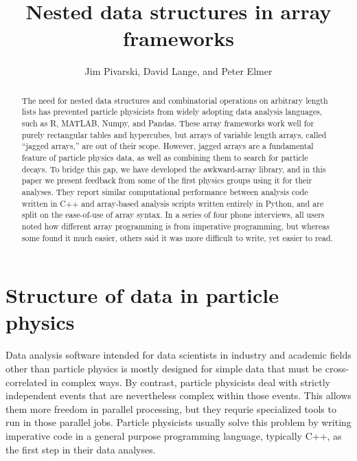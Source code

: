 \documentclass[a4paper]{jpconf}
\begin{document}
\title{Nested data structures in array frameworks}

\author{Jim Pivarski, David Lange, and Peter Elmer}

\address{Princeton University}


\begin{abstract}
The need for nested data structures and combinatorial operations on arbitrary length lists has prevented particle physicists from widely adopting data analysis languages, such as R, MATLAB, Numpy, and Pandas. These array frameworks work well for purely rectangular tables and hypercubes, but arrays of variable length arrays, called ``jagged arrays,'' are out of their scope. However, jagged arrays are a fundamental feature of particle physics data, as well as combining them to search for particle decays. To bridge this gap, we have developed the awkward-array library, and in this paper we present feedback from some of the first physics groups using it for their analyses. They report similar computational performance between analysis code written in C++ and array-based analysis scripts written entirely in Python, and are split on the ease-of-use of array syntax. In a series of four phone interviews, all users noted how different array programming is from imperative programming, but whereas some found it much easier, others said it was more difficult to write, yet easier to read.
\end{abstract}

\section{Structure of data in particle physics}

Data analysis software intended for data scientists in industry and academic fields other than particle physics is mostly designed for simple data that must be cross-correlated in complex ways. By contrast, particle physicists deal with strictly independent events that are nevertheless complex within those events. This allows them more freedom in parallel processing, but they requrie specialized tools to run in those parallel jobs. Particle physicists usually solve this problem by writing imperative code in a general purpose programming language, typically C++, as the first step in their data analyses.
\end{document}
